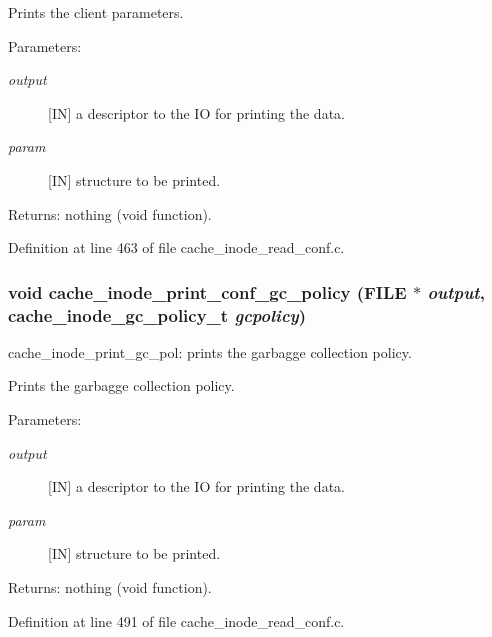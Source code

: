 Prints the client parameters.

\begin{Desc}
\item[Parameters:]
\begin{description}
\item[{\em output}][IN] a descriptor to the IO for printing the data. \item[{\em param}][IN] structure to be printed.\end{description}
\end{Desc}
\begin{Desc}
\item[Returns:]nothing (void function). \end{Desc}


Definition at line 463 of file cache\_\-inode\_\-read\_\-conf.c.
\subsubsection{\setlength{\rightskip}{0pt plus 5cm}void cache\_\-inode\_\-print\_\-conf\_\-gc\_\-policy (FILE $\ast$ {\em output}, cache\_\-inode\_\-gc\_\-policy\_\-t {\em gcpolicy})}\label{cache__inode__read__conf_8c_a5}


cache\_\-inode\_\-print\_\-gc\_\-pol: prints the garbagge collection policy.

Prints the garbagge collection policy.

\begin{Desc}
\item[Parameters:]
\begin{description}
\item[{\em output}][IN] a descriptor to the IO for printing the data. \item[{\em param}][IN] structure to be printed.\end{description}
\end{Desc}
\begin{Desc}
\item[Returns:]nothing (void function). \end{Desc}


Definition at line 491 of file cache\_\-inode\_\-read\_\-conf.c.
